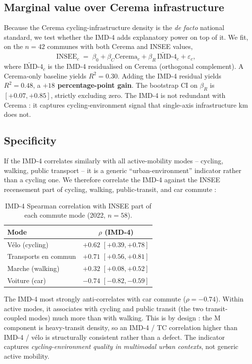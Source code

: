 \documentclass[11pt,a4paper]{article}
\newcommand{\IMD}{\mathrm{IMD}}
\begin{document}
\subsection{Marginal value over Cerema infrastructure}
\label{sec:residual}

Because the Cerema cycling-infrastructure density is the
\emph{de facto} national standard, we test whether the IMD-4 adds
explanatory power on top of it.  We fit, on the $n=42$ communes with
both Cerema and INSEE values,
\[
    \mathrm{INSEE}_c \;=\; \beta_0 + \beta_C \mathrm{Cerema}_c
              + \beta_R \, \widetilde{\IMD}\text{-}4_c + \varepsilon_c,
\]
where $\widetilde{\IMD}$-$4_c$ is the IMD-4 residualised on Cerema
(orthogonal complement).  A Cerema-only baseline yields
$R^{2} = 0.30$.  Adding the IMD-4 residual yields $R^{2} = 0.48$,
a \textbf{$+18$ percentage-point gain}.  The bootstrap CI on
$\beta_R$ is $[+0.07, +0.85]$, strictly excluding zero.  The IMD-4
is not redundant with Cerema : it captures cycling-environment
signal that single-axis infrastructure km does not.

\subsection{Specificity}

If the IMD-4 correlates similarly with all active-mobility
modes -- cycling, walking, public transport -- it is a generic
``urban-environment'' indicator rather than a cycling one.  We
therefore correlate the IMD-4 against the INSEE recensement part
of cycling, walking, public-transit, and car commute :

\begin{table}[H]
\centering
\caption{IMD-4 Spearman correlation with INSEE part of each
commute mode (2022, $n = 58$).}
\label{tab:specificity}
\small
\begin{tabular}{@{}lc@{}}
\toprule
Mode & $\rho$ (IMD-4) \\
\midrule
V\'elo (cycling)     & $+0.62$ $[+0.39, +0.78]$ \\
Transports en commun & $+0.71$ $[+0.56, +0.81]$ \\
Marche (walking)     & $+0.32$ $[+0.08, +0.52]$ \\
Voiture (car)        & $-0.74$ $[-0.82, -0.59]$ \\
\bottomrule
\end{tabular}
\end{table}

The IMD-4 most strongly anti-correlates with car commute
($\rho = -0.74$).  Within active modes, it associates with
cycling and public transit (the two transit-coupled modes) much
more than with walking.  This is by design : the M component is
heavy-transit density, so an IMD-4 / TC correlation higher than
IMD-4 / v\'elo is structurally consistent rather than a defect.
The indicator captures \emph{cycling-environment quality in
multimodal urban contexts}, not generic active mobility.
\end{document}
